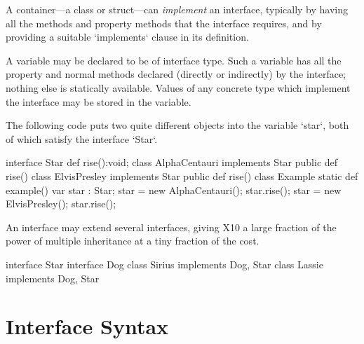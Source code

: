 
A container---a class or struct---can {\em implement} an interface,
typically by having all the methods and property methods that the interface
requires, and by providing a suitable \xcd`implements` clause in its definition.

A variable may be declared to be of interface type.  Such a variable has all
the property and normal methods declared (directly or indirectly) by the
interface; 
nothing else is statically available.  Values of any concrete type which
implement the interface may be stored in the variable.  

\begin{ex}
The following code puts two quite different objects into the variable
\xcd`star`, both of which satisfy the interface \xcd`Star`.
\begin{xten}
interface Star { def rise():void; }
class AlphaCentauri implements Star {
   public def rise() {}
}
class ElvisPresley implements Star {
   public def rise() {}
}
class Example {
   static def example() {
      var star : Star;
      star = new AlphaCentauri();
      star.rise();
      star = new ElvisPresley();
      star.rise();
   }
}
\end{xten}
%
\end{ex}
An interface may extend several interfaces, giving
X10 a large fraction of the power of multiple inheritance at a tiny fraction
of the cost.

\begin{ex}
\begin{xten}
interface Star{}
interface Dog{}
class Sirius implements Dog, Star{}
class Lassie implements Dog, Star{}
\end{xten}
%
\end{ex}


\section{Interface Syntax}

\label{DepType:Interface}


